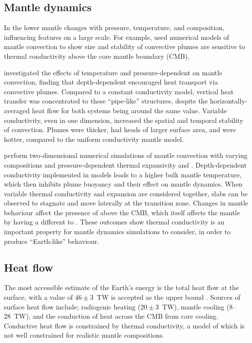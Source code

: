 \subsection{Mantle dynamics}

In the lower mantle \tcs changes with pressure, temperature, and composition, influencing features on a large scale. For example, \citet{Naliboff2006} used numerical models of mantle convection to show size and stability of convective plumes are sensitive to thermal conductivity above the core mantle boundary (CMB).

\citet{Dubuffet2000} investigated the effects of temperature and pressure-dependent \tcs on mantle convection, finding that depth-dependent \tcs encouraged heat transport via convective plumes. Compared to a constant conductivity model, vertical heat transfer was concentrated to these ``pipe-like'' structures, despite the horizontally-averaged heat flow for both systems being around the same value. Variable conductivity, even in one dimension, increased the spatial and temporal stability of convection. Plumes were thicker, had heads of larger surface area, and were hotter, compared to the uniform conductivity mantle model.

\citet{Tosi2013} perform two-dimensional numerical simulations of mantle convection with varying compositions and pressure-dependent thermal expansivity and \tc. Depth-dependent conductivity implemented in models leads to a higher bulk mantle temperature, which then inhibits plume buoyancy and their effect on mantle dynamics. When variable thermal conductivity and expansion are considered together, slabs can be observed to stagnate and move laterally at the transition zone. Changes in mantle behaviour affect the presence of \ppvs above the CMB, which itself affects the mantle by having a different \tcs to \bdg. These outcomes show thermal conductivity is an important property for mantle dynamics simulations to consider, in order to produce “Earth-like” behaviour.



\subsection{Heat flow}

The most accessible estimate of the Earth's energy is the total heat flow at the surface, with a value of $46\pm3$~TW is accepted as the upper bound \citep{Lay2008}. Sources of surface heat flow include; radiogenic heating ($20\pm3$~TW), mantle cooling (8--28~TW), and the conduction of heat across the CMB from core cooling. Conductive heat flow is constrained by thermal conductivity, a model of which is not well constrained for realistic mantle compositions.

